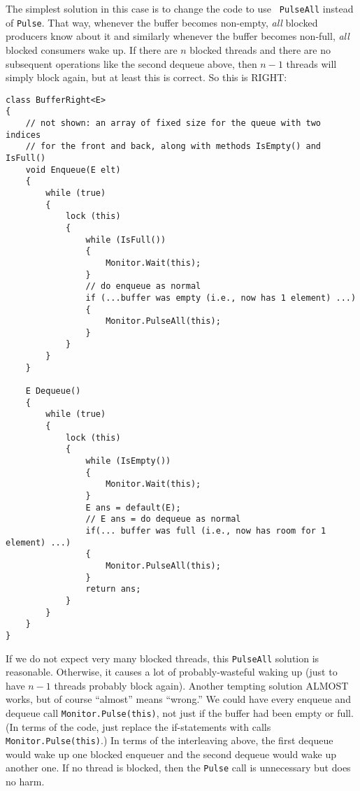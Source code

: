 \documentclass[10pt]{article}
\begin{document}
The simplest solution in this case is to change the code to use {\tt
  PulseAll} instead of {\tt Pulse}.  That way, whenever the buffer
  becomes non-empty, \emph{all} blocked producers know about it and
  similarly whenever the buffer becomes non-full, \emph{all} blocked
  consumers wake up.  If there are $n$ blocked threads and there are
  no subsequent operations like the second dequeue above, then $n-1$
  threads will simply block again, but at least this is correct.  So
  this is RIGHT:
\begin{verbatim}
class BufferRight<E>
{
    // not shown: an array of fixed size for the queue with two indices
    // for the front and back, along with methods IsEmpty() and IsFull()
    void Enqueue(E elt)
    {
        while (true)
        {
            lock (this)
            {
                while (IsFull())
                {
                    Monitor.Wait(this);
                }
                // do enqueue as normal
                if (...buffer was empty (i.e., now has 1 element) ...)
                {
                    Monitor.PulseAll(this);
                }
            }
        }
    }

    E Dequeue()
    {
        while (true)
        {
            lock (this)
            {
                while (IsEmpty())
                {
                    Monitor.Wait(this);
                }
                E ans = default(E);
                // E ans = do dequeue as normal
                if(... buffer was full (i.e., now has room for 1 element) ...)
                {
                    Monitor.PulseAll(this);
                }
                return ans;
            }
        }
    }
}
\end{verbatim}
If we do not expect very many blocked threads, this {\tt PulseAll}
solution is reasonable.  Otherwise, it causes a lot of
probably-wasteful waking up (just to have $n-1$ threads probably block
again).  Another tempting solution ALMOST works, but of course
``almost'' means ``wrong.''  We could have every enqueue and dequeue
call {\tt Monitor.Pulse(this)}, not just if the buffer had been empty or
full.  (In terms of the code, just replace the if-statements with
calls {\tt Monitor.Pulse(this)}.)  In terms of the interleaving above, the
first dequeue would wake up one blocked enqueuer and the second
dequeue would wake up another one.  If no thread is blocked, then the
{\tt Pulse} call is unnecessary but does no harm.
\end{document}
